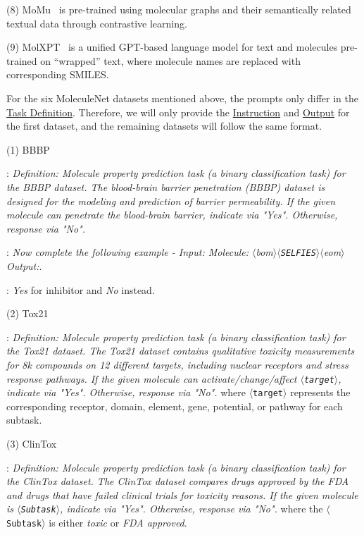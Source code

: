 \documentclass[11pt]{article}
\newcommand{\bom}{$\langle$bom$\rangle$}
\newcommand{\eom}{$\langle$eom$\rangle$}
\newcommand{\selfies}{$\langle$\texttt{SELFIES}$\rangle$}
\begin{document}
\noindent(8) MoMu~\citep{su2022molecular} is pre-trained using molecular graphs and their semantically related textual data through contrastive learning.

\noindent(9) MolXPT~\cite{liu2023molxpt} is a unified GPT-based language model for text and molecules pre-trained on ``wrapped'' text, where molecule names are replaced with corresponding SMILES.


\noindent For the six MoleculeNet datasets mentioned above, the prompts only differ in the \underline{Task Definition}. Therefore, we will only provide the \underline{Instruction} and \underline{Output} for the first dataset, and the remaining datasets will follow the same format.

\noindent(1) BBBP

:
\textit{Definition: Molecule property prediction task (a binary classification task) for the BBBP dataset. The blood-brain barrier penetration (BBBP) dataset is designed for the modeling and prediction of barrier permeability. If the given molecule can penetrate the blood-brain barrier, indicate via "Yes". Otherwise, response via "No".} 

:
\textit{Now complete the following example - Input: Molecule: \bom{}\selfies{}\eom{} Output:}.

: \textit{Yes} for inhibitor and \textit{No} instead.

\noindent(2) Tox21

:
\textit{Definition: Molecule property prediction task (a binary classification task) for the Tox21 dataset. The Tox21 dataset contains qualitative toxicity measurements for 8k compounds on 12 different targets, including nuclear receptors and stress response pathways. If the given molecule can activate/change/affect $\langle$\texttt{target}$\rangle$, indicate via "Yes". Otherwise, response via "No".} where $\langle$\texttt{target}$\rangle$ represents the corresponding receptor, domain, element, gene, potential, or pathway for each subtask.

\noindent(3) ClinTox

:
\textit{Definition: Molecule property prediction task (a binary classification task) for the ClinTox dataset. The ClinTox dataset compares drugs approved by the FDA and drugs that have failed clinical trials for toxicity reasons. If the given molecule is $\langle$\texttt{Subtask}$\rangle$, indicate via "Yes". Otherwise, response via "No".} where the $\langle$\texttt{Subtask}$\rangle$ is either \textit{toxic} or \textit{FDA approved}.
\end{document}
